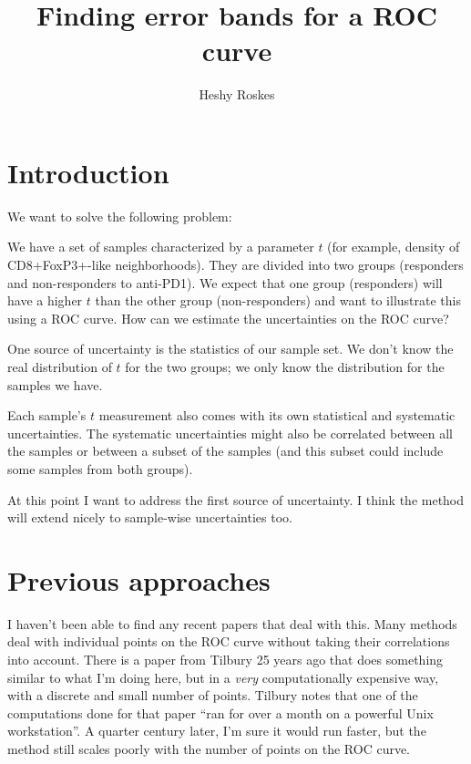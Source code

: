 \documentclass[11pt]{article}
\title{Finding error bands for a ROC curve}
\author{Heshy Roskes}
\date{}
\begin{document}
\maketitle

\section{Introduction}

We want to solve the following problem:

We have a set of samples characterized by a parameter \(t\) (for example, density of CD8+FoxP3+-like neighborhoods).  They are divided into two groups (responders and non-responders to anti-PD1).  We expect that one group (responders) will have a higher \(t\) than the other group (non-responders) and want to illustrate this using a ROC curve.  How can we estimate the uncertainties on the ROC curve?

One source of uncertainty is the statistics of our sample set.  We don't know the real distribution of \(t\) for the two groups; we only know the distribution for the samples we have.

Each sample's \(t\) measurement also comes with its own statistical and systematic uncertainties.  The systematic uncertainties might also be correlated between all the samples or between a subset of the samples (and this subset could include some samples from both groups).

At this point I want to address the first source of uncertainty.  I think the method will extend nicely to sample-wise uncertainties too.

\section{Previous approaches}

I haven't been able to find any recent papers that deal with this.  Many methods \autocite{roc_kerekes} deal with individual points on the ROC curve without taking their correlations into account.  There is a paper from Tilbury 25 years ago \autocite{roc_tilbury} that does something similar to what I'm doing here, but in a \emph{very} computationally expensive way, with a discrete and small number of points.  Tilbury notes that one of the computations done for that paper ``ran for over a month on a powerful Unix workstation''.  A quarter century later, I'm sure it would run faster, but the method still scales poorly with the number of points on the ROC curve.
\end{document}
